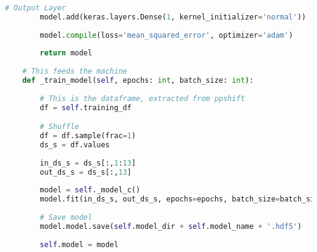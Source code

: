 \begin{lstlisting}[language=Python]
        # Output Layer  
        model.add(keras.layers.Dense(1, kernel_initializer='normal'))
    
        model.compile(loss='mean_squared_error', optimizer='adam')
        
        return model
    
    # This feeds the machine
    def _train_model(self, epochs: int, batch_size: int):
        
        # This is the dataframe, extracted from ppshift
        df = self.training_df 

        # Shuffle
        df = df.sample(frac=1)
        ds_s = df.values
        
        in_ds_s = ds_s[:,1:13]
        out_ds_s = ds_s[:,13]
        
        model = self._model_c()    
        model.fit(in_ds_s, out_ds_s, epochs=epochs, batch_size=batch_size)
        
        # Save model
        model.model.save(self.model_dir + self.model_name + '.hdf5')
        
        self.model = model

\end{lstlisting}


